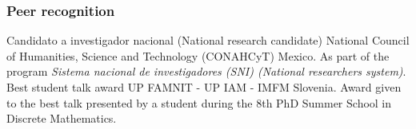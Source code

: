 \begin{enumerate}
\end{enumerate}



\subsubsection*{Peer recognition}

{
Candidato a investigador nacional%
{ (National research candidate)}%
}%
{%
{National Council of Humanities, Science and Technology (CONAHCyT)}%
}
{%
{Mexico.}%
}
{}
{
{As part of the program \emph{Sistema nacional de investigadores (SNI) (National researchers system)}.}%
}
{
{Best student talk award}%
}
{UP FAMNIT - UP IAM - IMFM}
{
{Slovenia.}%
}
{}
{
{Award given to the best talk presented by a student during the 8th PhD Summer School in Discrete Mathematics.}%
}

